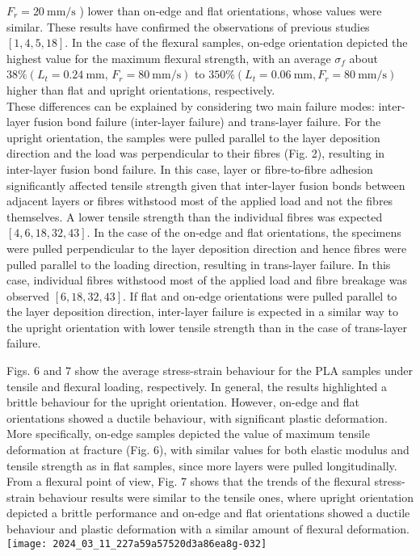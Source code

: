 \documentclass[10pt]{article}
\begin{document}
$F_{r}=20 \mathrm{~mm} / \mathrm{s}$ ) lower than on-edge and flat orientations, whose values were similar. These results have confirmed the observations of previous studies $[1,4,5,18]$. In the case of the flexural samples, on-edge orientation depicted the highest value for the maximum flexural strength, with an average $\sigma_{f}$ about $38 \%\left(L_{t}=0.24 \mathrm{~mm}\right.$, $\left.F_{r}=80 \mathrm{~mm} / \mathrm{s}\right)$ to $350 \%\left(L_{t}=0.06 \mathrm{~mm}, F_{r}=80 \mathrm{~mm} / \mathrm{s}\right)$ higher than flat and upright orientations, respectively.\\
These differences can be explained by considering two main failure modes: inter-layer fusion bond failure (inter-layer failure) and trans-layer failure. For the upright orientation, the samples were pulled parallel to the layer deposition direction and the load was perpendicular to their fibres (Fig. 2), resulting in inter-layer fusion bond failure. In this case, layer or fibre-to-fibre adhesion significantly affected tensile strength given that inter-layer fusion bonds between adjacent layers or fibres withstood most of the applied load and not the fibres themselves. A lower tensile strength than the individual fibres was expected $[4,6,18,32,43]$. In the case of the on-edge and flat orientations, the specimens were pulled perpendicular to the layer deposition direction and hence fibres were pulled parallel to the loading direction, resulting in trans-layer failure. In this case, individual fibres withstood most of the applied load and fibre breakage was observed $[6,18,32,43]$. If flat and on-edge orientations were pulled parallel to the layer deposition direction, inter-layer failure is expected in a similar way to the upright orientation with lower tensile strength than in the case of trans-layer failure.

Figs. 6 and 7 show the average stress-strain behaviour for the PLA samples under tensile and flexural loading, respectively. In general, the results highlighted a brittle behaviour for the upright orientation. However, on-edge and flat orientations showed a ductile behaviour, with significant plastic deformation. More specifically, on-edge samples depicted the value of maximum tensile deformation at fracture (Fig. 6), with similar values for both elastic modulus and tensile strength as in flat samples, since more layers were pulled longitudinally. From a flexural point of view, Fig. 7 shows that the trends of the flexural stress-strain behaviour results were similar to the tensile ones, where upright orientation depicted a brittle performance and on-edge and flat orientations showed a ductile behaviour and plastic deformation with a similar amount of flexural deformation.\\
\texttt{[image: 2024\_03\_11\_227a59a57520d3a86ea8g-032]}
\end{document}
